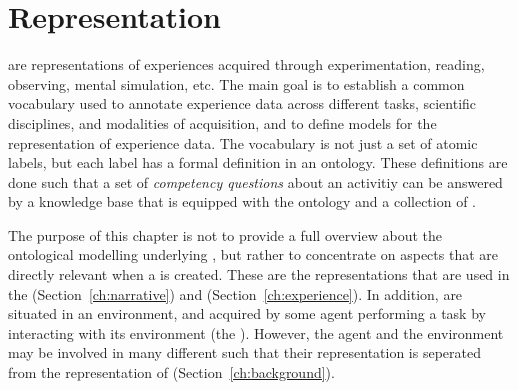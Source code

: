 \chapter{Representation}
\label{chap:represenation}

\neems are representations of experiences acquired through experimentation, reading, observing, mental simulation, etc.
The main goal is to establish a common vocabulary used to annotate experience data across different tasks, scientific disciplines, and modalities of acquisition, and to define models for the representation of experience data.
The vocabulary is not just a set of atomic labels, but each label has a formal definition in an ontology.
These definitions are done such that a set of \emph{competency questions} about an activitiy can be answered by a knowledge base that is equipped with the ontology and a collection of \neems.

The purpose of this chapter is not to provide a full overview about the ontological modelling underlying \neems, but rather to concentrate on aspects that are directly relevant when a \neem is created.
These are the representations that are used in the \neemnar (Section~\ref{ch:narrative}) and \neemexp (Section~\ref{ch:experience}).
In addition, \neems are situated in an environment, and acquired by some agent performing a task by interacting with its environment (the \neembak).
However, the agent and the environment may be involved in many different \neems such that their representation is seperated from the representation of \neems (Section~\ref{ch:background}).


\newpage


\newpage


\newpage



